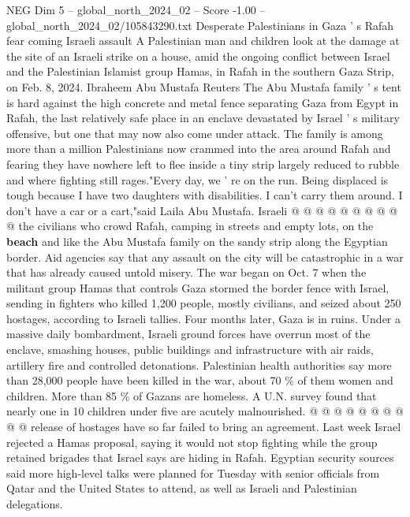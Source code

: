 \begin{textsample}{NEG Dim 5 – global\_north\_2024\_02 – Score -1.00 – global\_north\_2024\_02/105843290.txt}  \label{ex:f5_neg_212}
Desperate Palestinians in Gaza ' s Rafah fear coming Israeli assault A Palestinian man and children look at the damage at the site of an Israeli strike on a house, amid the ongoing conflict between Israel and the Palestinian Islamist group Hamas, in Rafah in the southern Gaza Strip, on Feb. 8, 2024.
Ibraheem Abu Mustafa Reuters The Abu Mustafa family ' s tent is hard against the high concrete and metal fence separating Gaza from Egypt in Rafah, the last relatively safe place in an enclave devastated by Israel ' s military offensive, but one that may now also come under attack.
The family is among more than a million Palestinians now crammed into the area around Rafah and fearing they have nowhere left to flee inside a tiny strip largely reduced to rubble and where fighting still rages."Every day, we ' re on the run.
Being displaced is tough because I have two daughters with disabilities.
I can't carry them around.
I don't have a car or a cart,"said Laila Abu Mustafa.
Israeli @ @ @ @ @ @ @ @ @ @ the civilians who crowd Rafah, camping in streets and empty lots, on the \textbf{beach} and like the Abu Mustafa family on the sandy strip along the Egyptian border.
Aid agencies say that any assault on the city will be catastrophic in a war that has already caused untold misery.
The war began on Oct. 7 when the militant group Hamas that controls Gaza stormed the border fence with Israel, sending in fighters who killed 1,200 people, mostly civilians, and seized about 250 hostages, according to Israeli tallies.
Four months later, Gaza is in ruins.
Under a massive daily bombardment, Israeli ground forces have overrun most of the enclave, smashing houses, public buildings and infrastructure with air raids, artillery fire and controlled detonations.
Palestinian health authorities say more than 28,000 people have been killed in the war, about 70 \% of them women and children.
More than 85 \% of Gazans are homeless.
A U.N. survey found that nearly one in 10 children under five are acutely malnourished. @ @ @ @ @ @ @ @ @ @ release of hostages have so far failed to bring an agreement.
Last week Israel rejected a Hamas proposal, saying it would not stop fighting while the group retained brigades that Israel says are hiding in Rafah.
Egyptian security sources said more high-level talks were planned for Tuesday with senior officials from Qatar and the United States to attend, as well as Israeli and Palestinian delegations.

\end{textsample}
